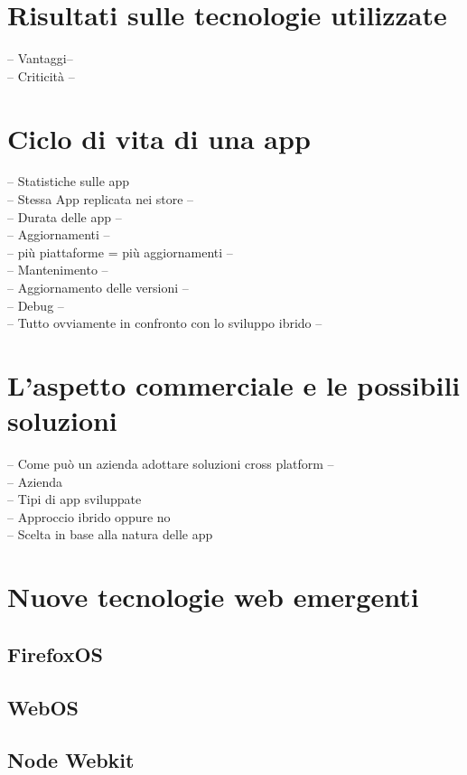 \section{Risultati sulle tecnologie utilizzate}

-- Vantaggi-- \\
-- Criticità --\\


\section{Ciclo di vita di una app}
-- Statistiche sulle app\\
	-- Stessa App replicata nei store --\\
	-- Durata delle app --\\
-- Aggiornamenti --\\
	-- più piattaforme = più aggiornamenti --\\
-- Mantenimento --\\
	-- Aggiornamento delle versioni --\\
	-- Debug --\\
-- Tutto ovviamente in confronto con lo sviluppo ibrido --

\section{L'aspetto commerciale e le possibili soluzioni}

-- Come può un azienda adottare soluzioni cross platform --\\
-- Azienda\\
	-- Tipi di app sviluppate\\
	-- Approccio ibrido oppure no\\
	-- Scelta in base alla natura delle app

\section{Nuove tecnologie web emergenti}

\subsection{FirefoxOS}

\subsection{WebOS}

\subsection{Node Webkit}